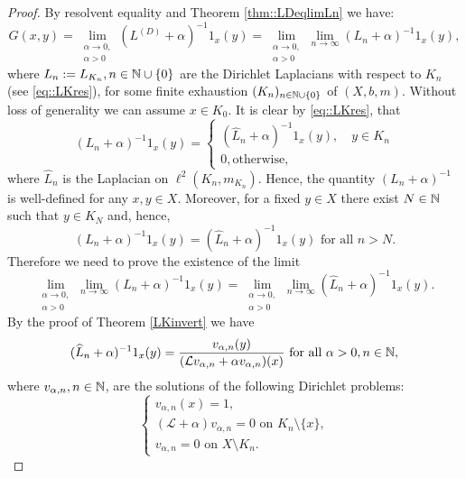 \documentclass[a4paper,11pt]{amsart}
\theoremstyle{definition}
\renewcommand{\L}{\mathcal{L}}
\begin{document}
\begin{proof}
By resolvent equality and Theorem \ref{thm::LDeqlimLn} we have:
\begin{equation}\label{eq::GxyeqL}
G(x,y)=\lim_{\substack{\alpha\to 0,\\\alpha>0}}(L^{(D)}+\alpha)^{-1}1_x(y)=\lim_{\substack{\alpha\to 0,\\\alpha>0}}\lim_{n\to\infty}({L_n}+\alpha)^{-1}1_x(y),
\end{equation}
where $L_n:=L_{K_n}, n\in \Bbb N\cup\{0\}$ are the Dirichlet Laplacians with respect to $K_n$ (see \eqref{eq::LKres}),  for some finite exhaustion $(K_n)_{ n\in \Bbb N\cup\{0\}}$ of $(X,b,m)$. Without loss of generality we can assume $x\in K_0$.  It is clear by \eqref{eq::LKres}, that
$$
(L_n+\alpha)^{-1}1_x(y)=
\begin{cases}(\widehat L_n+\alpha)^{-1}1_x(y),\quad y\in K_n\\
0, \mbox{otherwise},
\end{cases}
$$
where $\widehat L_n$ is the Laplacian on $\ell^2(K_n,m_{K_n})$. Hence, the quantity $({L_n}+\alpha)^{-1}$ is well-defined for any $x, y\in X$.  Moreover, for a fixed $y\in X$ there exist $N\in \Bbb N$ such that $y\in  K_N$ and, hence, 
\begin{equation}\label{eq::LnN}
(L_n+\alpha)^{-1}1_x(y)=(\widehat L_n+\alpha)^{-1}1_x(y) \mbox{ for all }n>N.
\end{equation}
 Therefore we need to prove the existence of the limit
$$
\lim_{\substack{\alpha\to 0,\\\alpha>0}}\lim_{n\to\infty}({L_n}+\alpha)^{-1}1_x(y)=\lim_{\substack{\alpha\to 0,\\\alpha>0}}\lim_{n\to\infty}({\widehat L_n}+\alpha)^{-1}1_x(y).
$$
By the proof of Theorem \ref{LKinvert} we have 
\begin{equation}\label{eq::LhateqL}
(\widehat {L}_n+\alpha)^{-1}1_x(y) =\dfrac{v_{\alpha,n}(y)}{(\L   v_{\alpha,n}+\alpha  v_{\alpha,n})(x)} \mbox{ for all }\alpha>0, n\in \Bbb N,
\end{equation}
where $v_{\alpha,n},n\in \Bbb N$, are the solutions of the following Dirichlet problems:
\begin{equation}\label{eq::dirpralpha1}
\begin{cases}
 v_{\alpha,n}(x)=1,\\
(\L +\alpha) v_{\alpha,n}=0\mbox{ on  }K_n\setminus\{x\},\\
 v_{\alpha,n}= 0 \mbox{ on  }X\setminus K_n.
\end{cases}
\end{equation}


\end{proof}
\end{document}
